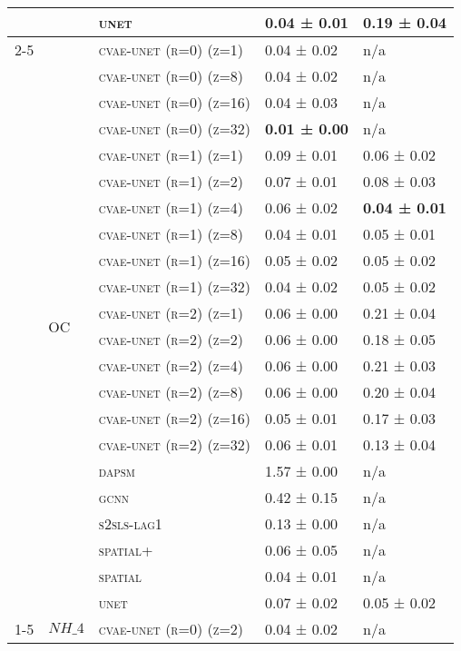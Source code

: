 \documentclass{article}
\begin{document}
\begin{table}[!tbp]
\begin{tabular}{lllll}
 &  & \textsc{unet} & 0.04 ± { 0.01} & 0.19 ± { 0.04} \\
\cline{2-5}
 & \multirow[t]{22}{*}{OC} & \textsc{cvae-unet (r=0) (z=1)} & 0.04 ± { 0.02} & n/a \\
 &  & \textsc{cvae-unet (r=0) (z=8)} & 0.04 ± { 0.02} & n/a \\
 &  & \textsc{cvae-unet (r=0) (z=16)} & 0.04 ± { 0.03} & n/a \\
 &  & \textsc{cvae-unet (r=0) (z=32)} & \bf 0.01 ± { 0.00} & n/a \\
 &  & \textsc{cvae-unet (r=1) (z=1)} & 0.09 ± { 0.01} & 0.06 ± { 0.02} \\
 &  & \textsc{cvae-unet (r=1) (z=2)} & 0.07 ± { 0.01} & 0.08 ± { 0.03} \\
 &  & \textsc{cvae-unet (r=1) (z=4)} & 0.06 ± { 0.02} & \bf 0.04 ± { 0.01} \\
 &  & \textsc{cvae-unet (r=1) (z=8)} & 0.04 ± { 0.01} & 0.05 ± { 0.01} \\
 &  & \textsc{cvae-unet (r=1) (z=16)} & 0.05 ± { 0.02} & 0.05 ± { 0.02} \\
 &  & \textsc{cvae-unet (r=1) (z=32)} & 0.04 ± { 0.02} & 0.05 ± { 0.02} \\
 &  & \textsc{cvae-unet (r=2) (z=1)} & 0.06 ± { 0.00} & 0.21 ± { 0.04} \\
 &  & \textsc{cvae-unet (r=2) (z=2)} & 0.06 ± { 0.00} & 0.18 ± { 0.05} \\
 &  & \textsc{cvae-unet (r=2) (z=4)} & 0.06 ± { 0.00} & 0.21 ± { 0.03} \\
 &  & \textsc{cvae-unet (r=2) (z=8)} & 0.06 ± { 0.00} & 0.20 ± { 0.04} \\
 &  & \textsc{cvae-unet (r=2) (z=16)} & 0.05 ± { 0.01} & 0.17 ± { 0.03} \\
 &  & \textsc{cvae-unet (r=2) (z=32)} & 0.06 ± { 0.01} & 0.13 ± { 0.04} \\
 &  & \textsc{dapsm} & 1.57 ± { 0.00} & n/a \\
 &  & \textsc{gcnn} & 0.42 ± { 0.15} & n/a \\
 &  & \textsc{s2sls-lag1} & 0.13 ± { 0.00} & n/a \\
 &  & \textsc{spatial+} & 0.06 ± { 0.05} & n/a \\
 &  & \textsc{spatial} & 0.04 ± { 0.01} & n/a \\
 &  & \textsc{unet} & 0.07 ± { 0.02} & 0.05 ± { 0.02} \\
\cline{1-5} \cline{2-5}
\multirow[t]{46}{*}{$ (SC)\; SO\_{4} \;\to\; PM\_{2.5}\; (r=2) $} & \multirow[t]{23}{*}{$ NH\_{4} $} & \textsc{cvae-unet (r=0) (z=2)} & 0.04 ± { 0.02} & n/a \\

\end{tabular}
\end{table}
\end{document}

